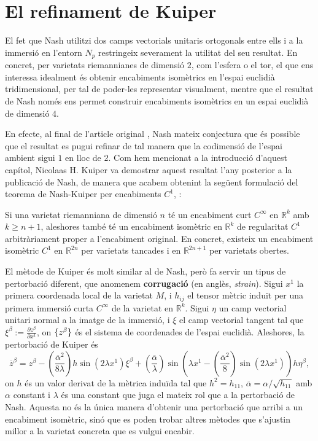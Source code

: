 \section{El refinament de Kuiper}
El fet que Nash utilitzi dos camps vectorials unitaris ortogonals entre ells i a la immersió en l'entorn $N_p$ restringeix severament la utilitat del seu resultat. En concret, per varietats riemannianes de dimensió $2$, com l'esfera o el tor, el que ens interessa idealment és obtenir encabiments isomètrics en l'espai euclidià tridimensional, per tal de poder-les representar visualment, mentre que el resultat de Nash només ens permet construir encabiments isomètrics en un espai euclidià de dimensió $4$. 

En efecte, al final de l'article original \cite{nash1954}, Nash mateix conjectura que és possible que el resultat es pugui refinar de tal manera que la codimensió de l'espai ambient sigui $1$ en lloc de $2$. Com hem mencionat a la introducció d'aquest capítol, Nicolaas H. Kuiper va demostrar aquest resultat l'any posterior a la publicació de Nash, de manera que acabem obtenint la següent formulació del teorema de Nash-Kuiper per encabiments $C^1$, \cite{kuiper1955}:

\begin{teo}
    Si una varietat riemanniana de dimensió $n$ té un encabiment curt $C^\infty$ en $\mathbb R^k$ amb $k\ge n+1$, aleshores també té un encabiment isomètric en $\mathbb R^k$ de regularitat $C^1$ arbitràriament proper a l'encabiment original. En concret, existeix un encabiment isomètric $C^1$ en $\mathbb R^{2n}$ per varietats tancades i en $\mathbb R^{2n+1}$ per varietats obertes.
\end{teo}

El mètode de Kuiper és molt similar al de Nash, però fa servir un tipus de pertorbació diferent, que anomenem \textbf{corrugació} (en anglès, \textit{strain}). Sigui $x^1$ la primera coordenada local de la varietat $M$, i $h_{ij}$ el tensor mètric induït per una primera immersió curta $C^\infty$ de la varietat en $\mathbb R^k$. Sigui $\eta$ un camp vectorial unitari normal a la imatge de la immersió, i $\xi$ el camp vectorial tangent tal que $\xi^\beta := \frac{\partial z^\beta}{\partial x^1}$, on $\{z^\beta\}$ és el sistema de coordenades de l'espai euclidià. Aleshores, la pertorbació de Kuiper és
\begin{equation*}
    \boxed{
        \overline{z}^\beta = z^\beta - \left(\frac{\overline \alpha^2}{8\lambda}\right)h\sin\left(2\lambda x^1\right)\xi^\beta + \left(\frac{\overline\alpha}{\lambda}\right)\sin\left(\lambda x^1 - \left(\frac{\overline\alpha ^2}{8}\right)\sin\left(2\lambda x^1\right)\right)h\eta^\beta,
        }
\end{equation*}
on $h$ és un valor derivat de la mètrica induïda tal que $h^2 = h_{11}$, $\overline\alpha = \alpha / \sqrt{h_{11}}$ amb $\alpha$ constant i $\lambda$ és una constant que juga el mateix rol que a la pertorbació de Nash. Aquesta no és la única manera d'obtenir una pertorbació que arribi a un encabiment isomètric, sinó que es poden trobar altres mètodes que s'ajustin millor a la varietat concreta que es vulgui encabir.
